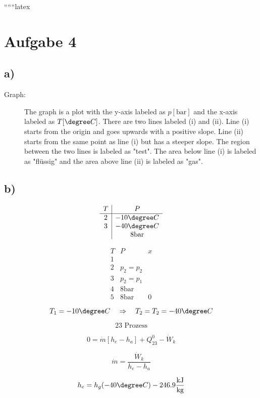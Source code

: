 
``````latex


\section*{Aufgabe 4}

\subsection*{a)}

\begin{description}
    \item[Graph:] The graph is a plot with the y-axis labeled as \( p[\text{bar}] \) and the x-axis labeled as \( T[\degree C] \). There are two lines labeled (i) and (ii). Line (i) starts from the origin and goes upwards with a positive slope. Line (ii) starts from the same point as line (i) but has a steeper slope. The region between the two lines is labeled as "test". The area below line (i) is labeled as "flüssig" and the area above line (ii) is labeled as "gas".
\end{description}

\subsection*{b)}

\[
\begin{array}{c|c}
T & P \\
\hline
2 & -10\degree C \\
3 & -40\degree C \\
 & 8 \text{bar}
\end{array}
\]

\[
\begin{array}{c|c|c}
T & P & x \\
\hline
1 & & \\
2 & p_2 = p_2 & \\
3 & p_2 = p_1 & \\
4 & 8 \text{bar} & \\
5 & 8 \text{bar} & 0
\end{array}
\]

\[
T_1 = -10\degree C \quad \Rightarrow \quad T_2 = T_2 = -40\degree C
\]

\[
23 \text{ Prozess}
\]

\[
0 = \dot{m} [h_e - h_a] + Q_{23}^0 - \dot{W}_k
\]

\[
\dot{m} = \frac{\dot{W}_k}{h_e - h_a}
\]

\[
h_e = h_g (-40\degree C) - 246.9 \frac{\text{kJ}}{\text{kg}}
\]

